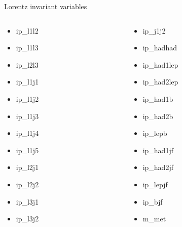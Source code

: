 \begin{frame}{Lorentz invariant variables}
  \begin{columns}
    \begin{column}{0.5\textwidth}
      \begin{itemize}
        \item ip\_l1l2
        \item ip\_l1l3
        \item ip\_l2l3
        \item ip\_l1j1
        \item ip\_l1j2
        \item ip\_l1j3
        \item ip\_l1j4
        \item ip\_l1j5
        \item ip\_l2j1
        \item ip\_l2j2
        \item ip\_l3j1
        \item ip\_l3j2
      \end{itemize}
    \end{column}
    \begin{column}{0.5\textwidth}
      \begin{itemize}
        \item ip\_j1j2
        \item ip\_hadhad
        \item ip\_had1lep
        \item ip\_had2lep
        \item ip\_had1b
        \item ip\_had2b
        \item ip\_lepb
        \item ip\_had1jf
        \item ip\_had2jf
        \item ip\_lepjf
        \item ip\_bjf
        \item m\_met
      \end{itemize}
    \end{column}
  \end{columns}
\end{frame}

